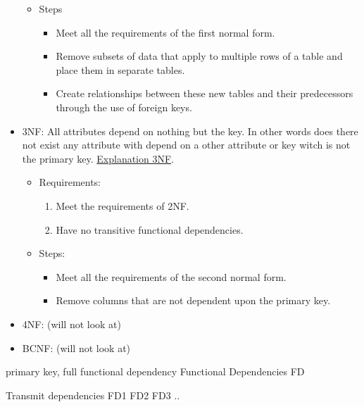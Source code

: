 \begin{itemize}
\begin{itemize}
\begin{enumerate}
        \end{enumerate}
        \item Steps
        \begin{itemize}
            \item Meet all the requirements of the first normal form.
            \item Remove subsets of data that apply to multiple rows of a table and place them in separate tables.
            \item Create relationships between these new tables and their predecessors through the use of foreign keys.
        \end{itemize}
    \end{itemize}
    \item 3NF: All attributes depend on nothing but the key. In other words 
    does there not exist any attribute with depend on a other attribute or key
    witch is not the primary key.
    \href{https://www.youtube.com/watch?v=aAx_JoEDXQA}{Explanation 3NF}.
    \begin{itemize}
        \item Requirements:
        \begin{enumerate}
            \item Meet the requirements of 2NF.
            \item Have no transitive functional dependencies.
        \end{enumerate}
        \item Steps:
        \begin{itemize}
            \item Meet all the requirements of the second normal form.
            \item Remove columns that are not dependent upon the primary key.
        \end{itemize}
    \end{itemize}
    \item 4NF: (will not look at)
    \item BCNF: (will not look at)
\end{itemize}

primary key, full functional dependency
Functional Dependencies FD

Transmit dependencies FD1 FD2 FD3 ..

\newpage
